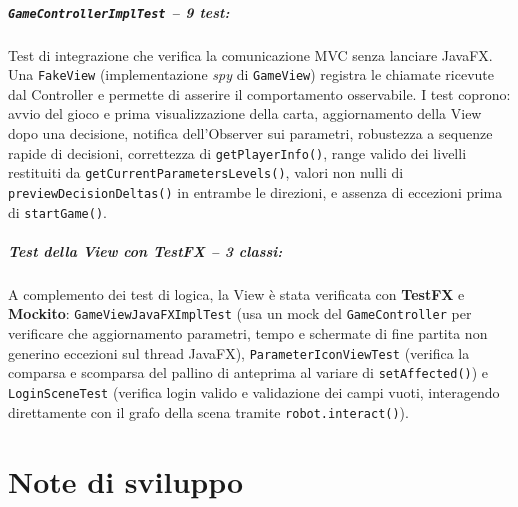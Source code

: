 \documentclass[11pt, a4paper, oneside]{report}
\begin{document}
\subparagraph{\texttt{GameControllerImplTest} -- 9 test:}
Test di integrazione che verifica la comunicazione MVC senza lanciare
JavaFX. Una \texttt{FakeView} (implementazione \emph{spy} di
\texttt{GameView}) registra le chiamate ricevute dal Controller e
permette di asserire il comportamento osservabile. I test coprono:
avvio del gioco e prima visualizzazione della carta, aggiornamento della
View dopo una decisione, notifica dell'Observer sui parametri,
robustezza a sequenze rapide di decisioni, correttezza di
\texttt{getPlayerInfo()}, range valido dei livelli restituiti da
\texttt{getCurrentParametersLevels()}, valori non nulli di
\texttt{previewDecisionDeltas()} in entrambe le direzioni, e assenza
di eccezioni prima di \texttt{startGame()}.

\subparagraph{Test della View con TestFX -- 3 classi:}
A complemento dei test di logica, la View è stata verificata con
\textbf{TestFX} e \textbf{Mockito}: \texttt{GameViewJavaFXImplTest}
(usa un mock del \texttt{GameController} per verificare che
aggiornamento parametri, tempo e schermate di fine partita non
generino eccezioni sul thread JavaFX), \texttt{ParameterIconViewTest}
(verifica la comparsa e scomparsa del pallino di anteprima al variare
di \texttt{setAffected()}) e \texttt{LoginSceneTest} (verifica login
valido e validazione dei campi vuoti, interagendo direttamente con
il grafo della scena tramite \texttt{robot.interact()}).

\section{Note di sviluppo}

\end{document}
